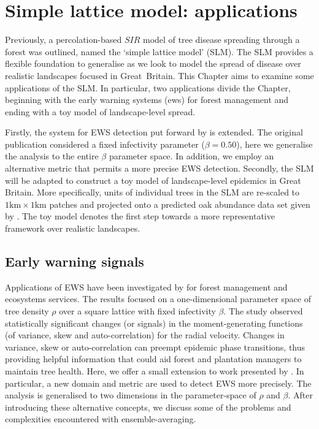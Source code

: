
\chapter{Simple lattice model: applications}
\label{chapter:SLM-applications}

Previously, a percolation-based $SIR$ model of tree disease spreading through a forest was outlined, named the `simple lattice model' (SLM).
The SLM provides a flexible foundation to generalise as we look to model the spread of disease over realistic landscapes focused in Great Britain.
This Chapter aims to examine some applications of the SLM.
In particular, two applications divide the Chapter, beginning with the early warning systems (\acrshort{ews}) for forest management and ending with a toy model of landscape-level spread.

Firstly, the system for EWS detection put forward by \cite{OROZCOFUENTES201912} is extended. 
The original publication considered a fixed infectivity parameter ($\beta = 0.50$), here we generalise the analysis to the entire $\beta$ parameter space. 
In addition, we employ an alternative metric that permits a more precise EWS detection.
Secondly, the SLM will be adapted to construct a toy model of landscape-level epidemics in Great Britain.
More specifically, units of individual trees in the SLM are re-scaled to $\mathrm{1km \times 1km}$ patches 
and projected onto a predicted oak abundance data set given by \cite{hill.data}.
The toy model denotes the first step towards a more representative framework over realistic landscapes.

\section{Early warning signals}
\label{sec:EWS}

Applications of EWS have been investigated by \cite{OROZCOFUENTES201912} for forest management and ecosystems services.
The results focused on a one-dimensional parameter space of tree density $\rho$ over a square lattice with fixed infectivity $\beta$.
The study observed statistically significant changes (or signals) in the
moment-generating functions (of variance, skew and auto-correlation) for the radial velocity.
Changes in variance, skew or auto-correlation can preempt epidemic phase transitions, 
thus providing helpful information that could aid forest and plantation managers to maintain tree health. 
Here, we offer a small extension to work presented by \cite{OROZCOFUENTES201912}.
In particular, a new domain and metric are used to detect EWS more precisely.  
The analysis is generalised to two dimensions in the parameter-space of $\rho$ and $\beta$. 
After introducing these alternative concepts, we discuss some of the problems and complexities encountered with ensemble-averaging. 

